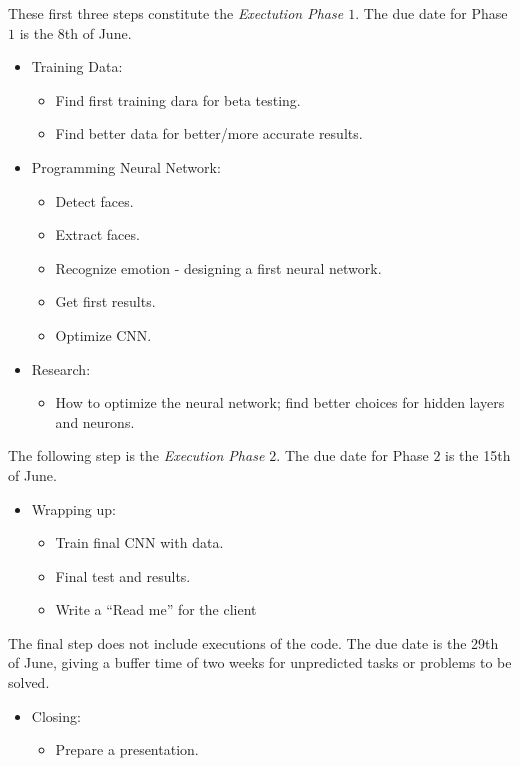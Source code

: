 These first three steps constitute the \textit{Exectution Phase $1$}. The due date for Phase $1$ is the 8th of June.

\begin{itemize}
\item Training Data:
	\begin{itemize}
	\item Find first training dara for beta testing.
	\item Find better data for better/more accurate results.
	\end{itemize}

\item Programming Neural Network:
	\begin{itemize}
	\item Detect faces.
	\item Extract faces.
	\item Recognize emotion - designing a first neural network.
	\item Get first results.
	\item Optimize CNN.
	\end{itemize}
	
\item Research:
	\begin{itemize}
	\item How to optimize the neural network; find better choices for hidden layers and neurons. 
	\end{itemize}
\end{itemize}

The following step is the \textit{Execution Phase $2$}. The due date for Phase $2$ is the 15th of June.

\begin{itemize}

\item Wrapping up:
	\begin{itemize}
	\item Train final CNN with data.
	\item Final test and results.
	\item Write a ``Read me'' for the client
	\end{itemize}

\end{itemize}

The final step does not include executions of the code. The due date is the 29th of June, giving a buffer time of two weeks for unpredicted tasks or problems to be solved.

\begin{itemize}
\item Closing:
	\begin{itemize}
	\item Prepare a presentation.
	\end{itemize}

\end{itemize}


